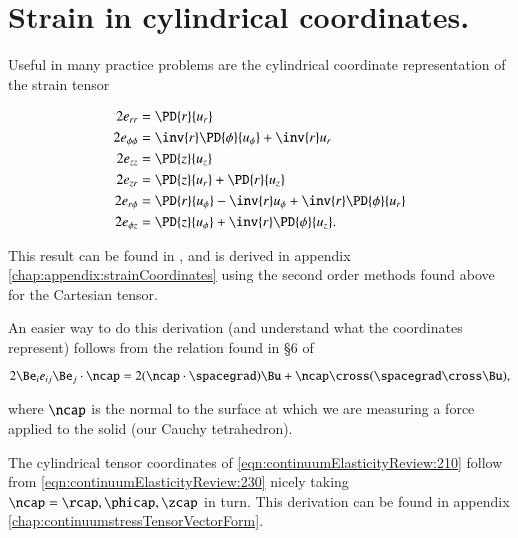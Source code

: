 % 
% 
% 
% 
% 
% 
% 
% 
% 
% 
% 
% 

\section{Strain in cylindrical coordinates.}

Useful in many practice problems are the cylindrical coordinate representation of the strain tensor 

\begin{align}\label{eqn:continuumElasticityReview:210}
2 e_{rr} &= \PD{r}{u_r}  \\
2 e_{\phi\phi} &= \inv{r} \PD{\phi}{u_\phi} +\inv{r} u_r  \\
2 e_{zz} &= \PD{z}{u_z}  \\
2 e_{zr} &= \PD{z}{u_r} + \PD{r}{u_z} \\
2 e_{r\phi} &= \PD{r}{u_\phi} - \inv{r} u_\phi + \inv{r} \PD{\phi}{u_r} \\
2 e_{\phi z} &= \PD{z}{u_\phi} +\inv{r} \PD{\phi}{u_z}.
\end{align}

This result can be found in \citep{landau1960theory}, and is derived in appendix \ref{chap:appendix:strainCoordinates} using the second order methods found above for the Cartesian tensor.

An easier way to do this derivation (and understand what the coordinates represent) follows from the relation found in \S 6 of \citep{acheson1990elementary}

\begin{equation}\label{eqn:continuumElasticityReview:230}
2 \Be_i e_{ij} \Be_j \cdot \ncap = 2 (\ncap \cdot \spacegrad) \Bu + \ncap \cross (\spacegrad \cross \Bu),
\end{equation}

where $\ncap$ is the normal to the surface at which we are measuring a force applied to the solid (our Cauchy tetrahedron).

The cylindrical tensor coordinates of \ref{eqn:continuumElasticityReview:210} follow from 
\ref{eqn:continuumElasticityReview:230} nicely taking $\ncap = \rcap, \phicap, \zcap$ in turn.  This derivation can be found in appendix \ref{chap:continuumstressTensorVectorForm}.
